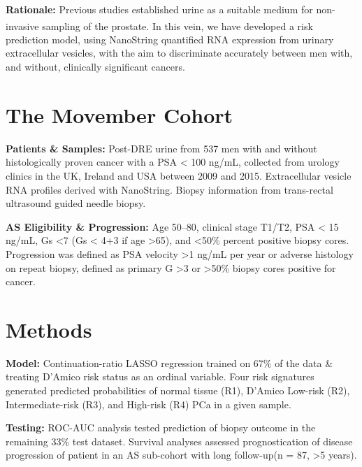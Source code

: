 \documentclass[article,30pt,extrafontsizes]{memoir}
\begin{document}
\begin{adjmulticols*}{2}{10mm}{10mm}
{\textbf{Rationale:} Previous studies established urine as a suitable
medium for non-invasive sampling of the
prostate\textsuperscript{\cite{McKiernan2016b,Tomlins2016a,Donovan2015,VanNeste2016}}.
In this vein, we have developed a risk prediction model, using
NanoString quantified RNA expression from urinary extracellular
vesicles, with the aim to discriminate accurately between men with, and
without, clinically significant cancers. \vspace{-28.5mm}

\hypertarget{the-movember-cohort}{%
\section{The Movember Cohort}\label{the-movember-cohort}}

\vspace{-7.5mm}

\textbf{Patients \& Samples:} Post-DRE urine from 537 men with and
without histologically proven cancer with a PSA \textless{} 100 ng/mL,
collected from urology clinics in the UK, Ireland and USA between 2009
and 2015. Extracellular vesicle RNA profiles derived with NanoString.
Biopsy information from trans-rectal ultrasound guided needle biopsy.

\textbf{AS Eligibility \& Progression:} Age 50--80, clinical stage
T1/T2, PSA \textless{} 15 ng/mL, Gs \textless{}7 (Gs \textless{} 4+3 if
age \textgreater{}65), and \textless{}50\% percent positive biopsy
cores. Progression was defined as PSA velocity \textgreater{}1 ng/mL per
year or adverse histology on repeat biopsy, defined as primary G
\textgreater{}3 or \textgreater{}50\% biopsy cores positive for cancer.

\vspace{-28.5mm}

\hypertarget{methods}{%
\section{Methods}\label{methods}}

\vspace{-7.5mm}

\textbf{Model:} Continuation-ratio LASSO regression trained on 67\% of
the data \& treating D'Amico risk status as an ordinal variable. Four
risk signatures generated predicted probabilities of normal tissue (R1),
D'Amico Low-risk (R2), Intermediate-risk (R3), and High-risk (R4) PCa in
a given sample.

\textbf{Testing:} ROC-AUC analysis tested prediction of biopsy outcome
in the remaining 33\% test dataset. Survival analyses assessed
prognostication of disease progression of patient in an AS sub-cohort
with long follow-up(n = 87, \textgreater{}5 years). \vspace{-28.5mm}

}
\end{adjmulticols*}
\end{document}
